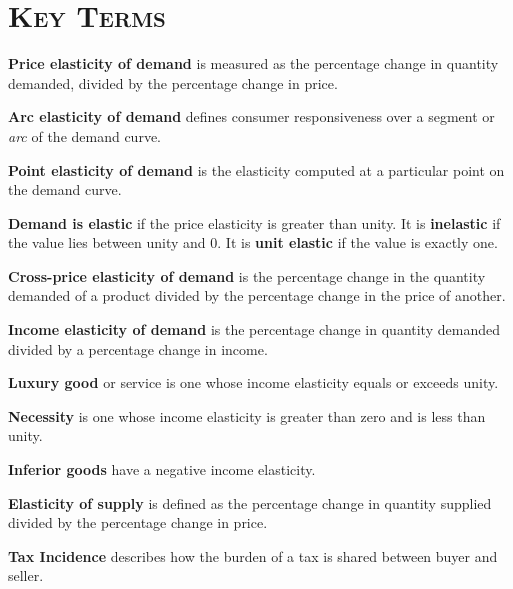 \newpage
{}
	\section*{\textsc{Key Terms}}
\begin{keyterms}
\textbf{Price elasticity of demand} is measured as the percentage change in quantity demanded, divided by the percentage change in price.

\textbf{Arc elasticity of demand} defines consumer responsiveness over a segment or \textit{arc} of the demand curve.

\textbf{Point elasticity of demand} is the elasticity computed at a particular point on the demand curve.

\textbf{Demand is elastic} if the price elasticity is greater than unity. It is \textbf{inelastic} if the value lies between unity and 0. It is \textbf{unit elastic} if the value is exactly one.

\textbf{Cross-price elasticity of demand} is the percentage change in the quantity demanded of a product divided by the percentage change in the price of another.

\textbf{Income elasticity of demand} is the percentage change in quantity demanded divided by a percentage change in income.

\textbf{Luxury good} or service is one whose income elasticity equals or exceeds unity.

\textbf{Necessity} is one whose income elasticity is greater than zero and is less than unity.

\textbf{Inferior goods} have a negative income elasticity.

\textbf{Elasticity of supply} is defined as the percentage change in quantity supplied divided by the percentage change in price.

\textbf{Tax Incidence} describes how the burden of a tax is shared between buyer and seller.
\end{keyterms}